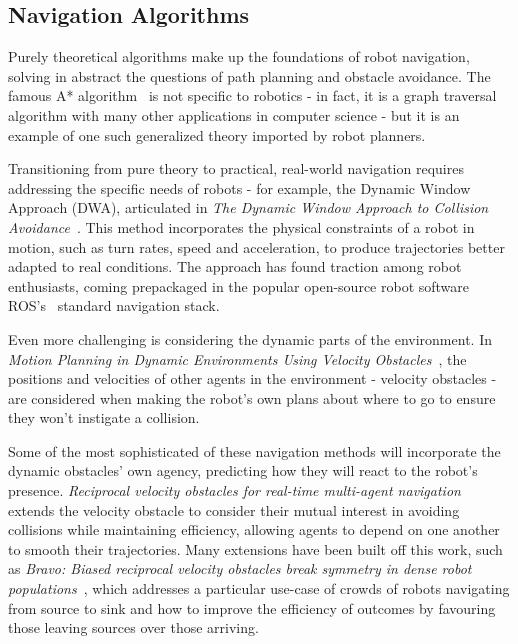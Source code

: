 \documentclass{sfuthesis}
\begin{document}
\subsection{Navigation Algorithms}

Purely theoretical algorithms make up the foundations of robot navigation, solving in abstract the questions of path planning and obstacle avoidance. The famous A* algorithm~\cite{hart1968formal} is not specific to robotics - in fact, it is a graph traversal algorithm with many other applications in computer science - but it is an example of one such generalized theory imported by robot planners. 

Transitioning from pure theory to practical, real-world navigation requires addressing the specific needs of robots - for example, the Dynamic Window Approach (DWA), articulated in \textit{The Dynamic Window Approach to Collision Avoidance}~\cite{fox1997dynamic}. This method incorporates the physical constraints of a robot in motion, such as turn rates, speed and acceleration, to produce trajectories better adapted to real conditions. The approach has found traction among robot enthusiasts, coming prepackaged in the popular open-source robot software ROS's~\cite{quigley2009ros} standard navigation stack.

Even more challenging is considering the dynamic parts of the environment. In \textit{Motion Planning in Dynamic Environments Using Velocity Obstacles}~\cite{fiorini1998motion}, the positions and velocities of other agents in the environment - velocity obstacles - are considered when making the robot's own plans about where to go to ensure they won't instigate a collision.

Some of the most sophisticated of these navigation methods will incorporate the dynamic obstacles' own agency, predicting how they will react to the robot's presence. \textit{Reciprocal velocity obstacles for real-time multi-agent navigation}~\cite{van2008reciprocal} extends the velocity obstacle to consider their mutual interest in avoiding collisions while maintaining efficiency, allowing agents to depend on one another to smooth their trajectories. Many extensions have been built off this work, such as \textit{Bravo: Biased reciprocal velocity obstacles break symmetry in dense robot populations}~\cite{sadat2012bravo}, which addresses a particular use-case of crowds of robots navigating from source to sink and how to improve the efficiency of outcomes by favouring those leaving sources over those arriving. 
\end{document}
